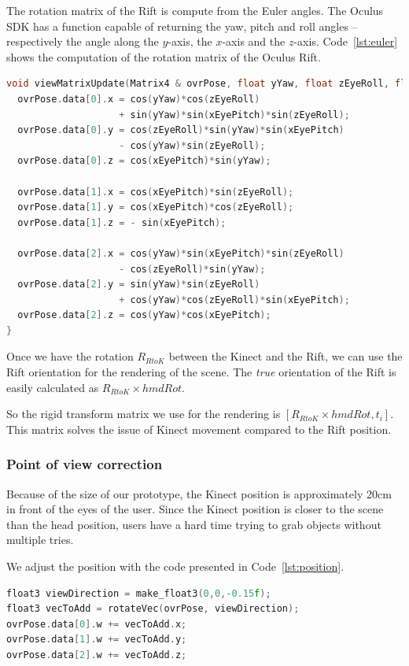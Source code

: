 \documentclass[12pt]{article}
\begin{document}
The rotation matrix of the Rift is compute from the Euler angles. The Oculus SDK has a function capable of returning the yaw, pitch and roll angles -- respectively the angle along the $y$-axis, the $x$-axis and the $z$-axis. Code~\ref{lst:euler} shows the computation of the rotation matrix of the Oculus Rift.

\begin{lstlisting}[language=C++, caption={C++ code for computing the rotation matrix of the Rift}, label={lst:euler}]
void viewMatrixUpdate(Matrix4 & ovrPose, float yYaw, float zEyeRoll, float xEyePitch){
  ovrPose.data[0].x = cos(yYaw)*cos(zEyeRoll)
                    + sin(yYaw)*sin(xEyePitch)*sin(zEyeRoll);
  ovrPose.data[0].y = cos(zEyeRoll)*sin(yYaw)*sin(xEyePitch)
                    - cos(yYaw)*sin(zEyeRoll);
  ovrPose.data[0].z = cos(xEyePitch)*sin(yYaw);
        
  ovrPose.data[1].x = cos(xEyePitch)*sin(zEyeRoll);
  ovrPose.data[1].y = cos(xEyePitch)*cos(zEyeRoll);
  ovrPose.data[1].z = - sin(xEyePitch);
        
  ovrPose.data[2].x = cos(yYaw)*sin(xEyePitch)*sin(zEyeRoll)
                    - cos(zEyeRoll)*sin(yYaw);
  ovrPose.data[2].y = sin(yYaw)*sin(zEyeRoll)
                    + cos(yYaw)*cos(zEyeRoll)*sin(xEyePitch);
  ovrPose.data[2].z = cos(yYaw)*cos(xEyePitch);
}
\end{lstlisting}

Once we have the rotation $R_{RtoK}$ between the Kinect and the Rift, we can use the Rift orientation for the rendering of the scene. The \textit{true} orientation of the Rift is easily calculated as $R_{RtoK}\times hmdRot$.

So the rigid transform matrix we use for the rendering is $[R_{RtoK}\times hmdRot,t_i]$. This matrix solves the issue of Kinect movement compared to the Rift position.

\subsubsection{Point of view correction}

Because of the size of our prototype, the Kinect position is approximately 20cm in front of the eyes of the user. Since the Kinect position is closer to the scene than the head position, users have a hard time trying to grab objects without multiple tries.

We adjust the position with the code presented in Code~\ref{lst:position}.

\begin{lstlisting}[language=C++, caption={C++ code for adjusting the position of the user}, label={lst:position}]
float3 viewDirection = make_float3(0,0,-0.15f);
float3 vecToAdd = rotateVec(ovrPose, viewDirection);
ovrPose.data[0].w += vecToAdd.x;
ovrPose.data[1].w += vecToAdd.y;
ovrPose.data[2].w += vecToAdd.z;
\end{lstlisting}
\end{document}
